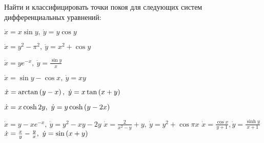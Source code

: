 	Найти и классифицировать точки покоя для следующих систем дифференциальных уравнений:
	\begin{multicols}{2}
		\begin{enumtasks}

			\label{stability_points:types_general}
			\item \( \dot{x} = x \sin{y}, ~ \dot{y} = y \cos{y} \) %
			\item \( \dot{x} = y^2 - \pi^2, ~ \dot{y} = x^2 + \cos{y} \) %
			\item \( \dot{x} = ye^{-x}, ~ \dot{y} = \frac{\sin{y}}{x} \) %
			\item \( \dot{x} = \sin{y} - \cos{x}, ~ \dot{y} = xy \) %
			\item \( \dot{x} = \arctan\left( y-x \right), ~ \dot{y} = x \tan\left( x + y \right) \) %
			\item \( \dot{x} = x \cosh{2y}, ~ \dot{y} = y \cosh\left( y - 2x \right) \) %
			
			\label{stability_points:types_general_hard}
			\item \( \dot{x} = y - xe^{-x}, ~ \dot{y} = y^2 - xy - 2y \) %
			\itemstar \( \dot{x} = \frac{2}{x^2 - y} + y, ~ \dot{y} = y^2 + \cos{\pi x} \) %
			\itemstar \( \dot{x} = \frac{\cos{x}}{y + 1}, \dot{y} = \frac{\sinh{y}}{x + 1} \) %
			\itemstar \( \dot{x} = \frac{x}{y} - \frac{y}{x}, ~ \dot{y} = \sin\left( x + y \right) \) %

		\end{enumtasks}
	\end{multicols}